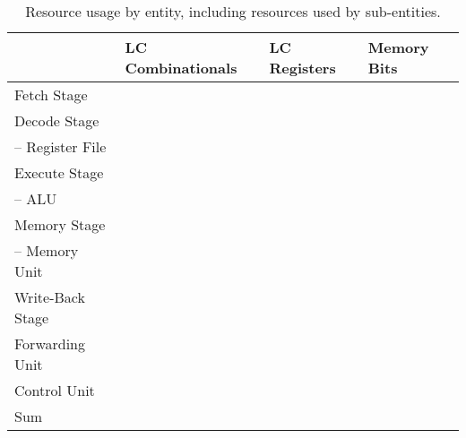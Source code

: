 \begin{table}[htb]
\centering
\caption{Resource usage by entity, including resources used by sub-entities.}
\begin{tabular}{llll}
	\toprule
	                     & LC Combinationals & LC Registers & Memory Bits \\
	\midrule
	Fetch Stage          &                   &              &             \\
	Decode Stage         &                   &              &             \\
	-- Register File     &                   &              &             \\
	Execute Stage        &                   &              &             \\
	-- ALU               &                   &              &             \\
	Memory Stage         &                   &              &             \\
	-- Memory Unit       &                   &              &             \\
	Write-Back Stage     &                   &              &             \\
	Forwarding Unit      &                   &              &             \\
	Control Unit         &                   &              &             \\
	\cmidrule{1-4}
	Sum                  &                   &              &             \\
\bottomrule
\end{tabular}
\end{table}

\begin{qa}
\end{qa}

